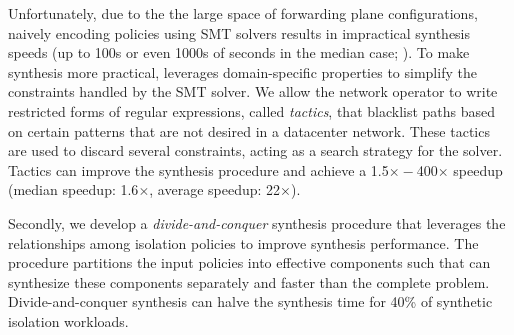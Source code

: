 
Unfortunately, due to the the large space of forwarding plane
configurations, naively encoding policies using SMT solvers results in
impractical synthesis speeds (up to 100s or even 1000s of seconds in
the median case; ).
To make synthesis more practical, \Name leverages domain-specific
properties to simplify the constraints handled by the SMT solver.
We allow the network operator to write restricted
forms of regular expressions, called \emph{tactics}, that blacklist
paths based on certain patterns that are not desired in a datacenter
network.
These tactics are used to discard several constraints, 
acting as a search strategy for the solver.
Tactics can improve the synthesis procedure and achieve
a 1.5$\times - $400$\times$ speedup 
(median speedup: 1.6$\times$, average speedup: 22$\times$).

 Secondly, we develop a \emph{divide-and-conquer} synthesis procedure
 that leverages the relationships among  isolation policies to
 improve synthesis performance. The procedure partitions the input
 policies into effective components such that \name can synthesize
 these components separately and faster than the complete problem.
 Divide-and-conquer synthesis can halve the synthesis time for 40\% of
 synthetic isolation workloads.


